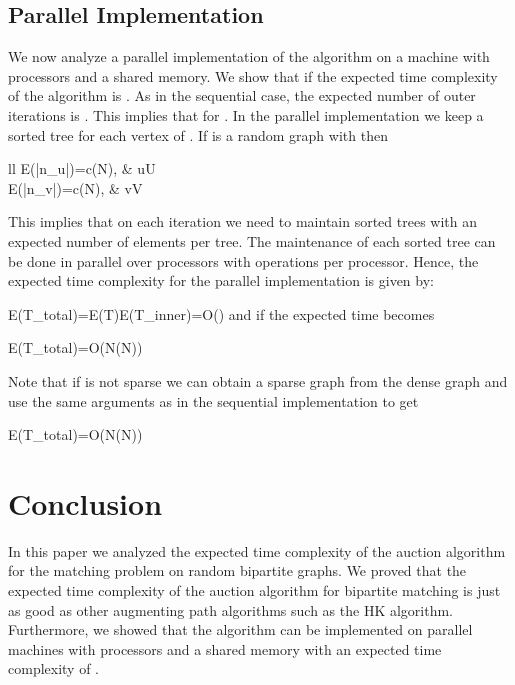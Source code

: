 \documentclass[11pt,onecolumn]{article}
\newcommand{\beq}{}
\newcommand{\bea}{\begin{array}}
\newcommand{\ena}{\end{array}}
\begin{document}
\subsection{Parallel Implementation}
We now analyze a parallel implementation of the algorithm on a machine with  processors and a shared memory. We show that if  the expected time complexity of the algorithm is . As in the sequential case, the expected number of outer iterations is . This implies that for  . In the parallel implementation we keep a sorted tree for each vertex of . If  is a random graph with  then
\beq
\bea{ll}
E(|n_u|)=c\log(N), & \forall u\in U\\
E(|n_v|)=c\log(N), & \forall v\in V\\
\ena
\eeq
This implies that on each iteration we need to maintain  sorted trees with an expected number of  elements per tree. The maintenance of each sorted tree can be done in parallel over  processors with  operations per processor. Hence, the expected time complexity for the parallel implementation is given by:
\beq
E(T_{total})=E(T)E(T_{inner})=O\left(\right)
\eeq
and if  the expected time becomes
\beq
E(T_{total})=O\left(N\log(N)\right)
\eeq

Note that if  is not sparse we can obtain a sparse graph from the dense graph and use the same arguments as in the sequential implementation to get
\beq
E(T_{total})=O\left(N\log(N)\right)
\eeq

\section {Conclusion}
In this paper we analyzed the expected time complexity of the auction algorithm for the matching problem on random bipartite graphs. We proved that the expected time complexity of the auction algorithm for bipartite matching is just as good as other augmenting path algorithms such  as the HK algorithm. Furthermore, we showed that the algorithm can be implemented on parallel machines with  processors and a shared memory with an expected time complexity of .
\end{document}
